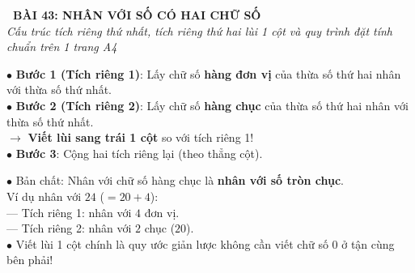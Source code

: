 \documentclass[14pt,a4paper,oneside]{extbook}
\begin{document}
\noindent
\begin{tcolorbox}[
  enhanced,
  colback=teal!8!white,
  colframe=teal!80!black,
  arc=3mm, boxrule=1pt,
  left=3mm, right=3mm, top=2mm, bottom=2mm,
  halign=center
]
  {\Large\bfseries\color{teal!90!black}\faBookmark\ BÀI 43: NHÂN VỚI SỐ CÓ HAI CHỮ SỐ}\\[1.5pt]
  {\footnotesize\itshape\color{black!75} Cấu trúc tích riêng thứ nhất, tích riêng thứ hai lùi 1 cột và quy trình đặt tính chuẩn trên 1 trang A4}
\end{tcolorbox}

\vspace{2mm}

\noindent
\begin{minipage}[t]{0.49\textwidth}
  \begin{tcolorbox}[
    enhanced,
    title={\footnotesize\bfseries\color{white}\faListOl\ 1. Quy trình đặt tính 3 bước},
    colback=blue!2!white,
    colframe=blue!75!black,
    arc=2.5mm, boxrule=0.8pt, top=1.8mm, bottom=1.8mm, left=2mm, right=2mm
  ]
    \footnotesize
    $\bullet$ \textbf{Bước 1 (Tích riêng 1)}: Lấy chữ số \textbf{hàng đơn vị} của thừa số thứ hai nhân với thừa số thứ nhất.\\
    $\bullet$ \textbf{Bước 2 (Tích riêng 2)}: Lấy chữ số \textbf{hàng chục} của thừa số thứ hai nhân với thừa số thứ nhất.\\
    $\rightarrow$ \textbf{Viết lùi sang trái 1 cột} so với tích riêng 1!\\
    $\bullet$ \textbf{Bước 3}: Cộng hai tích riêng lại (theo thẳng cột).
  \end{tcolorbox}
\end{minipage}%
\hfill
\begin{minipage}[t]{0.49\textwidth}
  \begin{tcolorbox}[
    enhanced,
    title={\footnotesize\bfseries\color{white}\faQuestionCircle\ 2. Vì sao tích riêng 2 lùi 1 cột?},
    colback=teal!2!white,
    colframe=teal!75!black,
    arc=2.5mm, boxrule=0.8pt, top=1.8mm, bottom=1.8mm, left=2mm, right=2mm
  ]
    \footnotesize
    $\bullet$ Bản chất: Nhân với chữ số hàng chục là \textbf{nhân với số tròn chục}.\\
    Ví dụ nhân với $24$ ($= 20 + 4$):\\
    --- Tích riêng 1: nhân với $4$ đơn vị.\\
    --- Tích riêng 2: nhân với $2$ chục ($20$).\\
    $\bullet$ Viết lùi 1 cột chính là quy ước giản lược không cần viết chữ số $0$ ở tận cùng bên phải!
  \end{tcolorbox}
\end{minipage}
\end{document}
